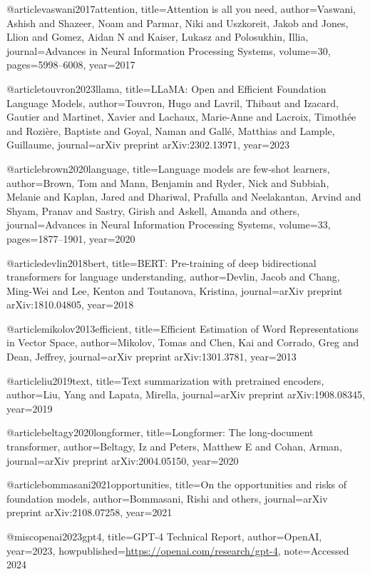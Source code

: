 @article{vaswani2017attention,
  title={Attention is all you need},
  author={Vaswani, Ashish and Shazeer, Noam and Parmar, Niki and Uszkoreit, Jakob and Jones, Llion and Gomez, Aidan N and Kaiser, Lukasz and Polosukhin, Illia},
  journal={Advances in Neural Information Processing Systems},
  volume={30},
  pages={5998--6008},
  year={2017}
}

@article{touvron2023llama,
  title={LLaMA: Open and Efficient Foundation Language Models},
  author={Touvron, Hugo and Lavril, Thibaut and Izacard, Gautier and Martinet, Xavier and Lachaux, Marie-Anne and Lacroix, Timothée and Rozière, Baptiste and Goyal, Naman and Gallé, Matthias and Lample, Guillaume},
  journal={arXiv preprint arXiv:2302.13971},
  year={2023}
}

@article{brown2020language,
  title={Language models are few-shot learners},
  author={Brown, Tom and Mann, Benjamin and Ryder, Nick and Subbiah, Melanie and Kaplan, Jared and Dhariwal, Prafulla and Neelakantan, Arvind and Shyam, Pranav and Sastry, Girish and Askell, Amanda and others},
  journal={Advances in Neural Information Processing Systems},
  volume={33},
  pages={1877--1901},
  year={2020}
}

@article{devlin2018bert,
  title={BERT: Pre-training of deep bidirectional transformers for language understanding},
  author={Devlin, Jacob and Chang, Ming-Wei and Lee, Kenton and Toutanova, Kristina},
  journal={arXiv preprint arXiv:1810.04805},
  year={2018}
}

@article{mikolov2013efficient,
  title={Efficient Estimation of Word Representations in Vector Space},
  author={Mikolov, Tomas and Chen, Kai and Corrado, Greg and Dean, Jeffrey},
  journal={arXiv preprint arXiv:1301.3781},
  year={2013}
}

@article{liu2019text,
  title={Text summarization with pretrained encoders},
  author={Liu, Yang and Lapata, Mirella},
  journal={arXiv preprint arXiv:1908.08345},
  year={2019}
}

@article{beltagy2020longformer,
  title={Longformer: The long-document transformer},
  author={Beltagy, Iz and Peters, Matthew E and Cohan, Arman},
  journal={arXiv preprint arXiv:2004.05150},
  year={2020}
}

@article{bommasani2021opportunities,
  title={On the opportunities and risks of foundation models},
  author={Bommasani, Rishi and others},
  journal={arXiv preprint arXiv:2108.07258},
  year={2021}
}

@misc{openai2023gpt4,
  title={GPT-4 Technical Report},
  author={OpenAI},
  year={2023},
  howpublished={\url{https://openai.com/research/gpt-4}},
  note={Accessed 2024}
}

